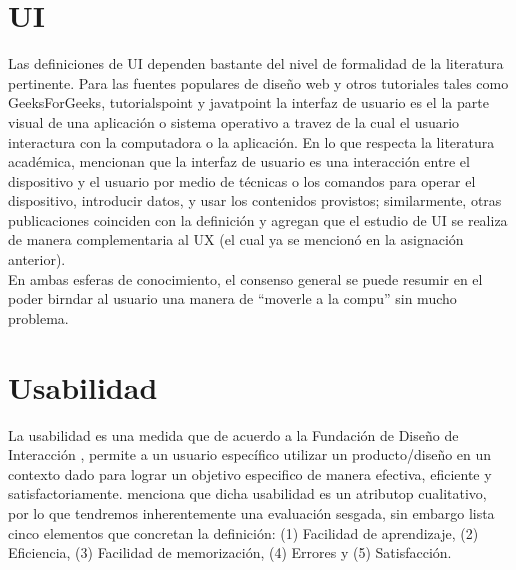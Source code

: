 \section{UI}
Las definiciones de UI dependen bastante del nivel de formalidad de la literatura
pertinente. Para las fuentes populares de diseño web y otros tutoriales tales como GeeksForGeeks, tutorialspoint y javatpoint \cite{tutorialspoint-2021,geeksforgeeks-2022,unknown-author-no-dateA} %
la interfaz de usuario es el la parte visual de una aplicación o sistema operativo a travez de la cual
el usuario interactura con la computadora o la aplicación. En lo que respecta la literatura
académica, \cite{sharma-2021} %
mencionan que la interfaz de usuario es una interacción entre
el dispositivo y el usuario por medio de técnicas o los comandos para operar el dispositivo,
introducir datos, y usar los contenidos provistos; similarmente, otras publicaciones
coinciden con la definición y agregan que el estudio de UI se realiza de manera complementaria al UX \cite{joo-2017,guntupalli-no-date}%
(el cual ya se mencionó en la asignación anterior).
\\

En ambas esferas de conocimiento, el consenso general se puede resumir en el poder birndar al usuario una
manera de ``moverle a la compu'' sin mucho problema.

\section{Usabilidad}
La usabilidad es una medida que de acuerdo a la Fundación de Diseño de Interacción \cite{unknown-author-no-dateC}, %
permite a un usuario específico utilizar un producto/diseño en un contexto dado para lograr
un objetivo especifico de manera efectiva, eficiente y satisfactoriamente. \cite{unknown-author-no-dateB} menciona %
que dicha usabilidad es un atributop cualitativo, por lo que tendremos inherentemente una
evaluación sesgada, sin embargo lista cinco elementos que concretan la definición:
(1) Facilidad de aprendizaje, (2) Eficiencia, (3) Facilidad de memorización, (4) Errores 
y (5) Satisfacción.
\\

